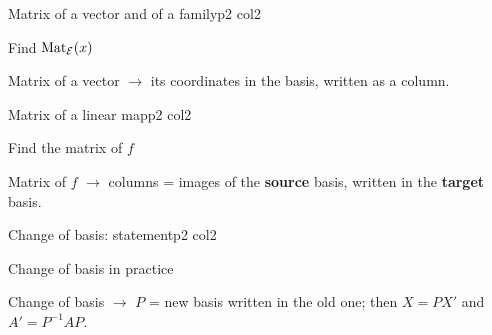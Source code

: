 \documentclass[sheet,noautoquant,noautokw]{neyvia-study}
\begin{document}
\begin{concept}[1.52]{Matrix of a vector and of a family}{p2 col2}
\begin{definition}
\end{definition}
\begin{method}{Find $\operatorname{Mat}_{\mathcal E}(x)$}
\end{method}
\begin{reflex}
Matrix of a vector \ensuremath{\rightarrow} its coordinates in the basis, written as a column.
\end{reflex}
\end{concept}
\begin{concept}[1.53]{Matrix of a linear map}{p2 col2}
\begin{definition}
\end{definition}
\begin{method}{Find the matrix of $f$}
\end{method}
\begin{reflex}
Matrix of $f$ \ensuremath{\rightarrow} columns = images of the \textbf{source} basis, written in the \textbf{target} basis.
\end{reflex}
\end{concept}
\begin{concept}[1.54]{Change of basis: statement}{p2 col2}
\begin{definition}
\end{definition}
\begin{method}{Change of basis in practice}
\end{method}
\begin{reflex}
Change of basis \ensuremath{\rightarrow} $P$ = new basis written in the old one; then $X=PX'$ and $A'=P^{-1}AP$.
\end{reflex}
\end{concept}
\end{document}
